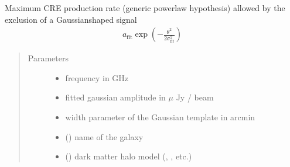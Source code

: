 \documentclass[letterpaper,10pt,english]{sphinxmanual}
\begin{document}
\begin{fulllineitems}
\label{\detokenize{diffsph:diffsph.limits.generic_rate_gausslim}}
\sphinxAtStartPar
Maximum CRE production rate (generic power\sphinxhyphen{}law hypothesis) allowed by the exclusion of a Gaussian\sphinxhyphen{}shaped signal
\begin{equation*}
\begin{split}a_\text{fit}\exp\left(-\frac{\theta^2}{2\sigma_\text{fit}^2}\right)\end{split}
\end{equation*}\begin{quote}\begin{description}
\item[{Parameters}] \leavevmode\begin{itemize}
\item {} 
\sphinxAtStartPar
{} \textendash{} frequency in GHz

\item {} 
\sphinxAtStartPar
{} \textendash{} fitted gaussian amplitude in \(\mu\) Jy / beam

\item {} 
\sphinxAtStartPar
{} \textendash{} width parameter of the Gaussian template in arcmin

\item {} 
\sphinxAtStartPar
{} () \textendash{} name of the galaxy

\item {} 
\sphinxAtStartPar
{} () \textendash{} dark matter halo model (, , etc.)


\end{itemize}
\end{description}
\end{quote}
\end{fulllineitems}
\end{document}
